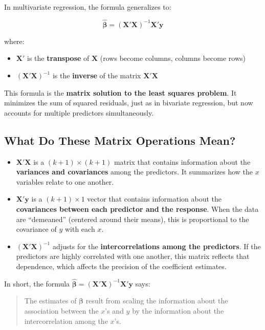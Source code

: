 \documentclass[
  letterpaper,
  DIV=11,
  numbers=noendperiod]{scrreprt}
\providecommand{\tightlist}{%
  \setlength{\itemsep}{0pt}\setlength{\parskip}{0pt}}
\begin{document}
In multivariate regression, the formula generalizes to:

\[
\hat{\boldsymbol{\beta}} = (\mathbf{X}'\mathbf{X})^{-1} \mathbf{X}' \mathbf{y}
\]

where:

\begin{itemize}
\tightlist
\item
  \(\mathbf{X}'\) is the \textbf{transpose} of \(\mathbf{X}\) (rows
  become columns, columns become rows)
\item
  \((\mathbf{X}'\mathbf{X})^{-1}\) is the \textbf{inverse} of the matrix
  \(\mathbf{X}'\mathbf{X}\)
\end{itemize}

This formula is the \textbf{matrix solution to the least squares
problem}. It minimizes the sum of squared residuals, just as in
bivariate regression, but now accounts for multiple predictors
simultaneously.

\subsection{What Do These Matrix Operations
Mean?}\label{what-do-these-matrix-operations-mean}

\begin{itemize}
\item
  \textbf{\(\mathbf{X}'\mathbf{X}\)} is a \((k+1) \times (k+1)\) matrix
  that contains information about the \textbf{variances and covariances}
  among the predictors. It summarizes how the \(x\) variables relate to
  one another.
\item
  \textbf{\(\mathbf{X}'\mathbf{y}\)} is a \((k+1) \times 1\) vector that
  contains information about the \textbf{covariances between each
  predictor and the response}. When the data are ``demeaned'' (centered
  around their means), this is proportional to the covariance of \(y\)
  with each \(x\).
\item
  \textbf{\((\mathbf{X}'\mathbf{X})^{-1}\)} adjusts for the
  \textbf{intercorrelations among the predictors}. If the predictors are
  highly correlated with one another, this matrix reflects that
  dependence, which affects the precision of the coefficient estimates.
\end{itemize}

In short, the formula
\(\hat{\boldsymbol{\beta}} = (\mathbf{X}'\mathbf{X})^{-1} \mathbf{X}' \mathbf{y}\)
says:

\begin{quote}
The estimates of \(\boldsymbol{\beta}\) result from scaling the
information about the association between the \(x\)'s and \(y\) by the
information about the intercorrelation among the \(x\)'s.
\end{quote}
\end{document}
